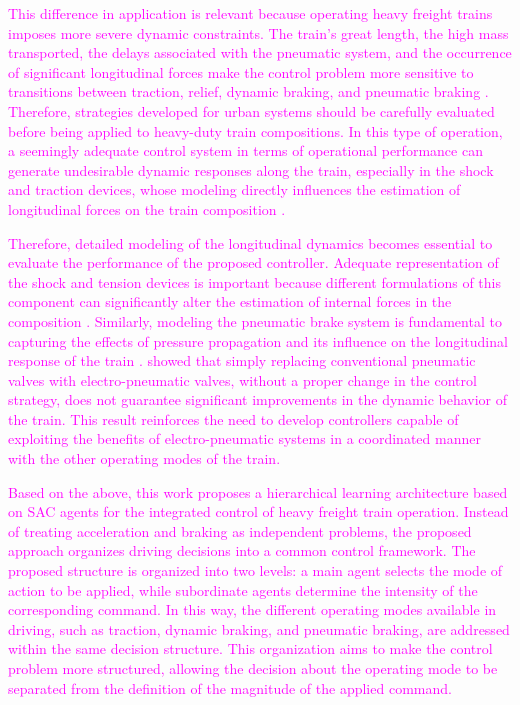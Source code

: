 \documentclass[preprint,10pt]{elsarticle}
\begin{document}
\textcolor{Magenta}{This difference in application is relevant because operating heavy freight trains imposes more severe dynamic constraints. The train's great length, the high mass transported, the delays associated with the pneumatic system, and the occurrence of significant longitudinal forces make the control problem more sensitive to transitions between traction, relief, dynamic braking, and pneumatic braking \citep{eckert2025multi,wu2023freight}. Therefore, strategies developed for urban systems should be carefully evaluated before being applied to heavy-duty train compositions. In this type of operation, a seemingly adequate control system in terms of operational performance can generate undesirable dynamic responses along the train, especially in the shock and traction devices, whose modeling directly influences the estimation of longitudinal forces on the train composition \citep{eckert2025multi,wu2018parallel,wagner2021review,yadav2023influence,wu2014review}.}

\textcolor{Magenta}{Therefore, detailed modeling of the longitudinal dynamics becomes essential to evaluate the performance of the proposed controller. Adequate representation of the shock and tension devices is important because different formulations of this component can significantly alter the estimation of internal forces in the composition \citep{wu2018parallel,wagner2021review,yadav2023influence,wu2014review}. Similarly, modeling the pneumatic brake system is fundamental to capturing the effects of pressure propagation and its influence on the longitudinal response of the train \citep{wu2023freight}.  
\cite{eckert2025multi} showed that simply replacing conventional pneumatic valves with electro-pneumatic valves, without a proper change in the control strategy, does not guarantee significant improvements in the dynamic behavior of the train. This result reinforces the need to develop controllers capable of exploiting the benefits of electro-pneumatic systems in a coordinated manner with the other operating modes of the train.}

\textcolor{Magenta}{Based on the above, this work proposes a hierarchical learning architecture based on SAC agents for the integrated control of heavy freight train operation. Instead of treating acceleration and braking as independent problems, the proposed approach organizes driving decisions into a common control framework. The proposed structure is organized into two levels: a main agent selects the mode of action to be applied, while subordinate agents determine the intensity of the corresponding command. In this way, the different operating modes available in driving, such as traction, dynamic braking, and pneumatic braking, are addressed within the same decision structure. This organization aims to make the control problem more structured, allowing the decision about the operating mode to be separated from the definition of the magnitude of the applied command.}
\end{document}
